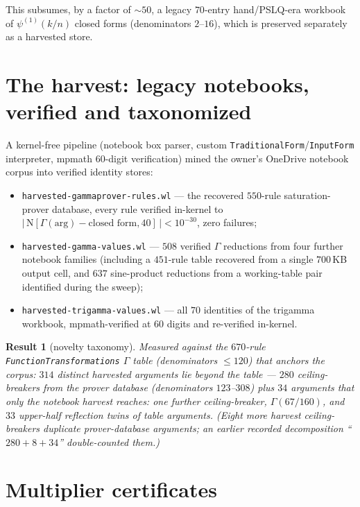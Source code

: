 \documentclass[11pt]{article}
\newtheorem{result}{Result}[section]
\theoremstyle{remark}
\begin{document}
This subsumes, by a factor of ${\sim}50$, a legacy $70$-entry hand/PSLQ-era workbook of
$\psi^{(1)}(k/n)$ closed forms (denominators $2$--$16$), which is preserved separately as a
harvested store.

\section{The harvest: legacy notebooks, verified and taxonomized}\label{sec:harvest}

A kernel-free pipeline (notebook box parser, custom
\texttt{TraditionalForm}/\texttt{InputForm} interpreter, mpmath $60$-digit verification)
mined the owner's OneDrive notebook corpus into verified identity stores:

\begin{itemize}
\item \texttt{harvested-gammaprover-rules.wl} --- the recovered $550$-rule saturation-prover
database, every rule verified in-kernel to $|\,\mathrm{N}[\Gamma(\text{arg})-\text{closed
form},40]\,|<10^{-30}$, zero failures;
\item \texttt{harvested-gamma-values.wl} --- $508$ verified $\Gamma$ reductions from four
further notebook families (including a $451$-rule table recovered from a single $700$\,KB
output cell, and $637$ sine-product reductions from a working-table pair identified during
the sweep);
\item \texttt{harvested-trigamma-values.wl} --- all $70$ identities of the trigamma
workbook, mpmath-verified at $60$ digits and re-verified in-kernel.
\end{itemize}

\begin{result}[novelty taxonomy]\label{res:novelty}
Measured against the $670$-rule \texttt{FunctionTransformations} $\Gamma$ table
\cite{FT} (denominators $\le120$) that anchors the corpus: $314$ distinct harvested arguments lie
beyond the table --- $280$ ceiling-breakers from the prover database (denominators
$123$--$308$) plus $34$ arguments that only the notebook harvest reaches: one further
ceiling-breaker, $\Gamma(67/160)$, and $33$ upper-half reflection twins of table
arguments. (Eight more harvest ceiling-breakers duplicate prover-database arguments;
an earlier recorded decomposition ``$280+8+34$'' double-counted them.)
\end{result}

\section{Multiplier certificates}\label{sec:certmodel}
\end{document}
